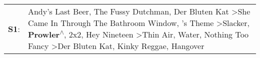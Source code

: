 \begin{supertabular}{p{0.03\textwidth}p{0.92\textwidth}}
 \textbf{S1}:  &  Andy's Last Beer\textsuperscript{}, \enspace The Fussy Dutchman\textsuperscript{}, \enspace Der Bluten Kat\textsuperscript{} \textgreater \enspace She Came In Through The Bathroom Window\textsuperscript{}, 's Theme\textsuperscript{} \textgreater \enspace Slacker\textsuperscript{}, \enspace \textbf{Prowler\textsuperscript{$\wedge$}}, \enspace 2x2\textsuperscript{}, \enspace Hey Nineteen\textsuperscript{} \textgreater \enspace Thin Air\textsuperscript{}, \enspace Water\textsuperscript{}, \enspace Nothing Too Fancy\textsuperscript{} \textgreater \enspace Der Bluten Kat\textsuperscript{}, \enspace Kinky Reggae\textsuperscript{}, \enspace Hangover\textsuperscript{}  \enspace  \\
\end{supertabular}

